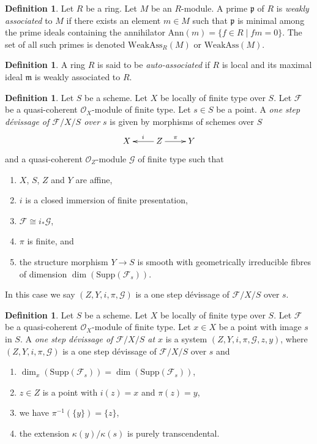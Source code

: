 \documentclass{amsart}
\theoremstyle{plain}
\theoremstyle{definition}
\newtheorem{definition}[subsection]{Definition}
\theoremstyle{remark}
\numberwithin{equation}{subsection}
\begin{document}
\begin{definition}
\label{algebra-definition-weakly-associated}
Let $R$ be a ring. Let $M$ be an $R$-module.
A prime $\mathfrak p$ of $R$ is {\it weakly associated} to $M$
if there exists an element $m \in M$ such that $\mathfrak p$ is minimal
among the prime ideals containing the annihilator
$\text{Ann}(m) = \{f \in R \mid fm = 0\}$.
The set of all such primes is denoted $\text{WeakAss}_R(M)$
or $\text{WeakAss}(M)$.
\end{definition}

\begin{definition}
\label{more-algebra-definition-auto-ass}
A ring $R$ is said to be {\it auto-associated} if $R$ is local and its
maximal ideal $\mathfrak m$ is weakly associated to $R$.
\end{definition}

\begin{definition}
\label{definition-one-step-devissage}
Let $S$ be a scheme.
Let $X$ be locally of finite type over $S$.
Let $\mathcal{F}$ be a quasi-coherent $\mathcal{O}_X$-module of finite type.
Let $s \in S$ be a point.
A {\it one step d\'evissage of $\mathcal{F}/X/S$ over $s$}
is given by morphisms of schemes over $S$
$$
\xymatrix{
X & Z \ar[l]_i \ar[r]^\pi & Y
}
$$
and a quasi-coherent $\mathcal{O}_Z$-module $\mathcal{G}$ of finite type
such that
\begin{enumerate}
\item $X$, $S$, $Z$ and $Y$ are affine,
\item $i$ is a closed immersion of finite presentation,
\item $\mathcal{F} \cong i_*\mathcal{G}$,
\item $\pi$ is finite, and
\item the structure morphism $Y \to S$ is smooth with
geometrically irreducible fibres of
dimension $\dim(\text{Supp}(\mathcal{F}_s))$.
\end{enumerate}
In this case we say $(Z, Y, i, \pi, \mathcal{G})$ is a one step
d\'evissage of $\mathcal{F}/X/S$ over $s$.
\end{definition}

\begin{definition}
\label{definition-one-step-devissage-at-x}
Let $S$ be a scheme.
Let $X$ be locally of finite type over $S$.
Let $\mathcal{F}$ be a quasi-coherent $\mathcal{O}_X$-module of finite type.
Let $x \in X$ be a point with image $s$ in $S$.
A {\it one step d\'evissage of $\mathcal{F}/X/S$ at $x$}
is a system $(Z, Y, i, \pi, \mathcal{G}, z, y)$, where
$(Z, Y, i, \pi, \mathcal{G})$ is a one step d\'evissage of
$\mathcal{F}/X/S$ over $s$ and
\begin{enumerate}
\item $\dim_x(\text{Supp}(\mathcal{F}_s)) = \dim(\text{Supp}(\mathcal{F}_s))$,
\item $z \in Z$ is a point with $i(z) = x$ and $\pi(z) = y$,
\item we have $\pi^{-1}(\{y\}) = \{z\}$,
\item the extension $\kappa(y)/\kappa(s)$ is purely
transcendental.
\end{enumerate}
\end{definition}
\end{document}
